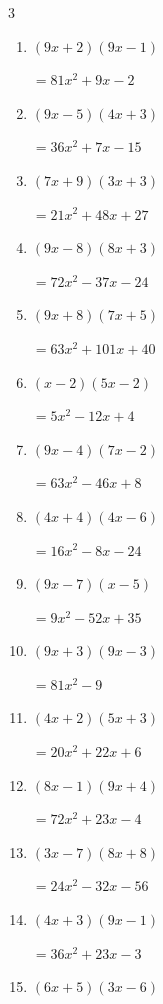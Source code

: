 \begin{multicols}{3}
\begin{enumerate}
        $=6x^{2}-54$

\columnbreak %

\resetques

  \item $(9x+2)(9x-1)$

        $=81x^{2}+9x-2$

  \item $(9x-5)(4x+3)$

        $=36x^{2}+7x-15$

  \item $(7x+9)(3x+3)$

        $=21x^{2}+48x+27$

  \item $(9x-8)(8x+3)$

        $=72x^{2}-37x-24$

  \item $(9x+8)(7x+5)$

        $=63x^{2}+101x+40$

  \item $(x-2)(5x-2)$

        $=5x^{2}-12x+4$

  \item $(9x-4)(7x-2)$

        $=63x^{2}-46x+8$

  \item $(4x+4)(4x-6)$

        $=16x^{2}-8x-24$

  \item $(9x-7)(x-5)$

        $=9x^{2}-52x+35$

  \item $(9x+3)(9x-3)$

        $=81x^{2}-9$

  \item $(4x+2)(5x+3)$

        $=20x^{2}+22x+6$

  \item $(8x-1)(9x+4)$

        $=72x^{2}+23x-4$

  \item $(3x-7)(8x+8)$

        $=24x^{2}-32x-56$

  \item $(4x+3)(9x-1)$

        $=36x^{2}+23x-3$

  \item $(6x+5)(3x-6)$


\end{enumerate}
\end{multicols}
